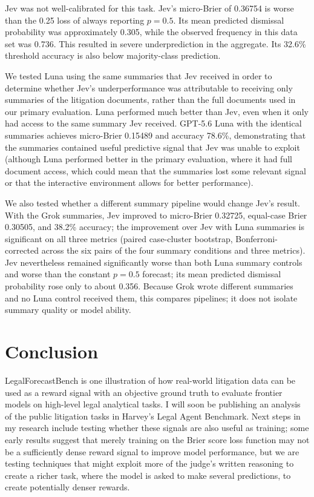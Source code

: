 \documentclass[11pt]{article}
\begin{document}
Jev was not well-calibrated for this task. Jev's micro-Brier of 0.36754 is worse than the 0.25 loss of always reporting $p=0.5$. Its mean predicted dismissal probability was approximately 0.305, while the observed frequency in this data set was 0.736. This resulted in severe underprediction in the aggregate. Its 32.6\% threshold accuracy is also below majority-class prediction.

We tested Luna using the same summaries that Jev received in order to determine whether Jev's underperformance was attributable to receiving only summaries of the litigation documents, rather than the full documents used in our primary evaluation. Luna performed much better than Jev, even when it only had access to the same summary Jev received. GPT-5.6 Luna with the identical summaries achieves micro-Brier 0.15489 and accuracy 78.6\%, demonstrating that the summaries contained useful predictive signal that Jev was unable to exploit (although Luna performed better in the primary evaluation, where it had full document access, which could mean that the summaries lost some relevant signal or that the interactive environment allows for better performance).

We also tested whether a different summary pipeline would change Jev's result. With the Grok summaries, Jev improved to micro-Brier 0.32725, equal-case Brier 0.30505, and 38.2\% accuracy; the improvement over Jev with Luna summaries is significant on all three metrics (paired case-cluster bootstrap, Bonferroni-corrected across the six pairs of the four summary conditions and three metrics). Jev nevertheless remained significantly worse than both Luna summary controls and worse than the constant $p=0.5$ forecast; its mean predicted dismissal probability rose only to about 0.356. Because Grok wrote different summaries and no Luna control received them, this compares pipelines; it does not isolate summary quality or model ability.

\section{Conclusion}

LegalForecastBench is one illustration of how real-world litigation data can be used as a reward signal with an objective ground truth to evaluate frontier models on high-level legal analytical tasks. I will soon be publishing an analysis of the public litigation tasks in Harvey's Legal Agent Benchmark. Next steps in my research include testing whether these signals are also useful as training; some early results suggest that merely training on the Brier score loss function may not be a sufficiently dense reward signal to improve model performance, but we are testing techniques that might exploit more of the judge's written reasoning to create a richer task, where the model is asked to make several predictions, to create potentially denser rewards.
\end{document}
